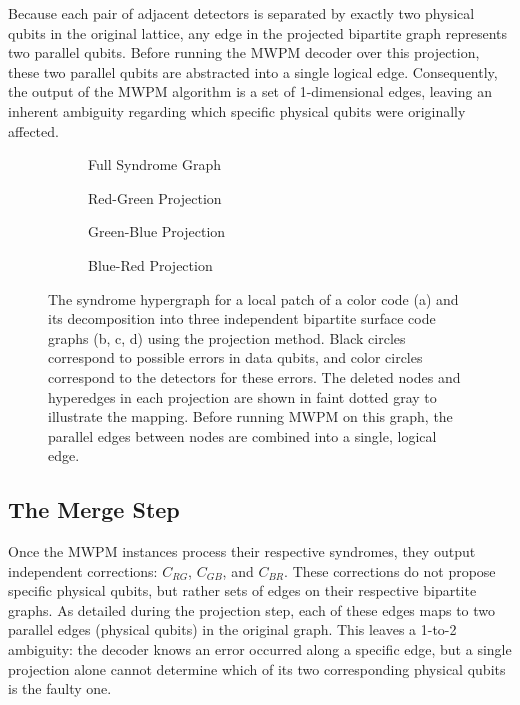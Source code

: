 Because each pair of adjacent detectors is separated by exactly two physical qubits in the original lattice, any edge in the projected bipartite graph represents two parallel qubits. Before running the MWPM decoder over this projection, these two parallel qubits are abstracted into a single logical edge. Consequently, the output of the MWPM algorithm is a set of 1-dimensional edges, leaving an inherent ambiguity regarding which specific physical qubits were originally affected.

\begin{figure}[htbp]
    \centering
    \begin{subfigure}[b]{0.45\textwidth}
        \centering
        
        \caption{Full Syndrome Graph}
    \end{subfigure}
    \hfill
    \begin{subfigure}[b]{0.45\textwidth}
        \centering
        
        \caption{Red-Green Projection}
    \end{subfigure}

    \vspace{0.5cm}

    \begin{subfigure}[b]{0.45\textwidth}
        \centering
        
        \caption{Green-Blue Projection}
    \end{subfigure}
    \hfill
    \begin{subfigure}[b]{0.45\textwidth}
        \centering
        
        \caption{Blue-Red Projection}
    \end{subfigure}
    \caption[Syndrome hypergraph for local patch of a color code and its three projections.]{The syndrome hypergraph for a local patch of a color code (a) and its decomposition into three independent bipartite surface code graphs (b, c, d) using the projection method. Black circles correspond to possible errors in data qubits, and color circles correspond to the detectors for these errors. The deleted nodes and hyperedges in each projection are shown in faint dotted gray to illustrate the mapping. Before running MWPM on this graph, the parallel edges between nodes are combined into a single, logical edge.}
    \label{fig:projection_graphs}
\end{figure}


\subsection{The Merge Step}
Once the MWPM instances process their respective syndromes, they output independent corrections: $C_{RG}$, $C_{GB}$, and $C_{BR}$. These corrections do not propose specific physical qubits, but rather sets of edges on their respective bipartite graphs. As detailed during the projection step, each of these edges maps to two parallel edges (physical qubits) in the original graph. This leaves a 1-to-2 ambiguity: the decoder knows an error occurred along a specific edge, but a single projection alone cannot determine which of its two corresponding physical qubits is the faulty one.


